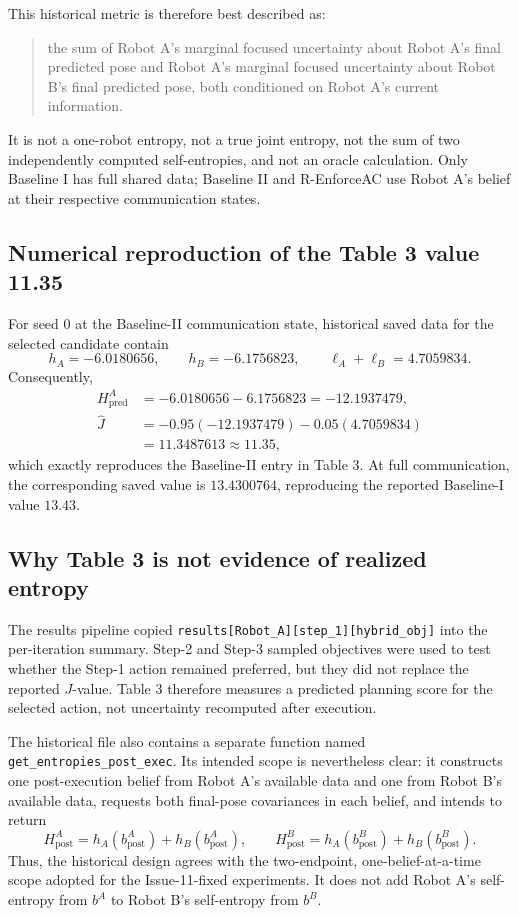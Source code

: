 \documentclass[11pt,a4paper]{article}
\begin{document}
This historical metric is therefore best described as:
\begin{quote}
the sum of Robot A's marginal focused uncertainty about Robot A's final
predicted pose and Robot A's marginal focused uncertainty about Robot B's
final predicted pose, both conditioned on Robot A's current information.
\end{quote}
It is not a one-robot entropy, not a true joint entropy, not the sum of two
independently computed self-entropies, and not an oracle calculation.  Only
Baseline I has full shared data; Baseline II and R-EnforceAC use Robot A's
belief at their respective communication states.

\subsection{Numerical reproduction of the Table 3 value 11.35}

For seed 0 at the Baseline-II communication state, historical saved data for
the selected candidate contain
\[
 h_A=-6.0180656,\qquad h_B=-6.1756823,\qquad
 \ell_A+\ell_B=4.7059834.
\]
Consequently,
\begin{align*}
 H_{\mathrm{pred}}^A
 &=-6.0180656-6.1756823=-12.1937479,\\
 \widehat J
 &=-0.95(-12.1937479)-0.05(4.7059834)\\
 &=11.3487613\approx 11.35,
\end{align*}
which exactly reproduces the Baseline-II entry in Table 3.  At full
communication, the corresponding saved value is $13.4300764$, reproducing
the reported Baseline-I value $13.43$.

\subsection{Why Table 3 is not evidence of realized entropy}

The results pipeline copied
\texttt{results[Robot\_A][step\_1][hybrid\_obj]} into the per-iteration
summary.  Step-2 and Step-3 sampled objectives were used to test whether the
Step-1 action remained preferred, but they did not replace the reported
$J$-value.  Table 3 therefore measures a predicted planning score for the
selected action, not uncertainty recomputed after execution.

The historical file also contains a separate function named
\texttt{get\_entropies\_post\_exec}.  Its intended scope is nevertheless
clear: it constructs one post-execution belief from Robot A's available data
and one from Robot B's available data, requests both final-pose covariances in
each belief, and intends to return
\[
 H_{\mathrm{post}}^A
 =h_A(b_{\mathrm{post}}^A)+h_B(b_{\mathrm{post}}^A),
 \qquad
 H_{\mathrm{post}}^B
 =h_A(b_{\mathrm{post}}^B)+h_B(b_{\mathrm{post}}^B).
\]
Thus, the historical design agrees with the two-endpoint, one-belief-at-a-time
scope adopted for the Issue-11-fixed experiments.  It does not add Robot A's
self-entropy from $b^A$ to Robot B's self-entropy from $b^B$.
\end{document}
